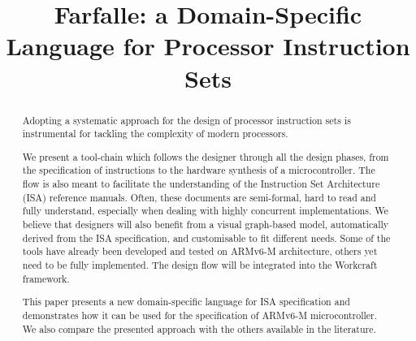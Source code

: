 \documentclass[conference]{IEEEtran}
\begin{document}


\title{Farfalle: a Domain-Specific Language for Processor Instruction Sets}

\author{
\and
{}
\and
{}
}

\maketitle

\begin{abstract}
Adopting a systematic approach for the design of processor instruction sets is
instrumental for tackling the complexity of modern processors.

We present a tool-chain which follows the designer through all the design phases,
from the specification of instructions to the hardware synthesis of a
microcontroller. The flow is also meant to facilitate the understanding of the
Instruction Set Architecture (ISA) reference manuals. Often, these documents are
semi-formal, hard to read and fully understand, especially when dealing with
highly concurrent implementations. We believe that designers will also
benefit from a visual graph-based model, automatically derived from the ISA
specification, and customisable to fit different needs. Some of the tools have
already been developed and tested on ARMv6-M architecture, others yet need to be
fully implemented. The design flow will be integrated into the Workcraft framework.

This paper presents a new domain-specific language for ISA specification and demonstrates
how it can be used for the specification of ARMv6-M microcontroller. We also compare
the presented approach with the others available in the literature.
\end{abstract}
\end{document}
